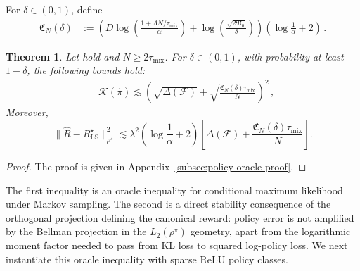 \documentclass{article}
\newtheorem{theorem}[proposition]{Theorem}
\theoremstyle{definition}
\theoremstyle{remark}
\theoremstyle{plain}
\newcommand{\tmix}{\tau_{\mathrm{mix}}}
\def\eqsp{\,}
\numberwithin{equation}{section}
\begin{document}
For \(\delta\in(0,1)\), define
\begin{align}
\label{eq:first-stage-rate}
        \mathfrak C_N(\delta)
    &:=
    \left(D\log\left(
        \frac{1+\Lambda N/\tau_{\mathrm{mix}}}{\alpha}
    \right)
    +
    \log\left(\frac{\sqrt{2\mathfrak N_0}}{\delta}\right)\right)\left(\log\frac1\alpha+2\right)\eqsp.
\end{align} 
\begin{theorem}
\label{thm:hp-reward}
Let  hold and $N\geq2\tmix$. For $\delta\in(0,1)$, with probability at least $1-\delta$, the following bounds hold:
\begin{equation}
\label{eq:KL-eps}
\begin{aligned}
    &\mathcal{K}(\widehat\pi)
   \lesssim
    \left(\sqrt{\Delta(\mathcal F)}
    +
    \sqrt{
        \frac{\mathfrak C_N(\delta)\tmix}{N}
    }
    \right)^2\eqsp, 
\end{aligned}
\end{equation}
Moreover, 
\begin{equation}
\label{eq:hp-reward}
    \|\widehat R-R_{\mathrm{LS}}^\star\|_{\rho^\star}^2
    \lesssim
    \lambda^2\left(\log\frac1\alpha+2\right)
    \left[
        \Delta(\mathcal F)
        +
        \frac{\mathfrak C_N(\delta)\tmix}{N}
    \right].
\end{equation}
\end{theorem}
\begin{proof}
    The proof is given in Appendix~\ref{subsec:policy-oracle-proof}.
\end{proof}
The first inequality is an oracle inequality for conditional maximum likelihood under Markov sampling. The second is a direct stability consequence of the orthogonal projection defining the canonical reward: policy error is not amplified by the Bellman projection in the $L_2(\rho^\star)$ geometry, apart from the logarithmic moment factor needed to pass from KL loss to squared log-policy loss.
We next instantiate this oracle inequality with sparse ReLU policy classes.
\end{document}
